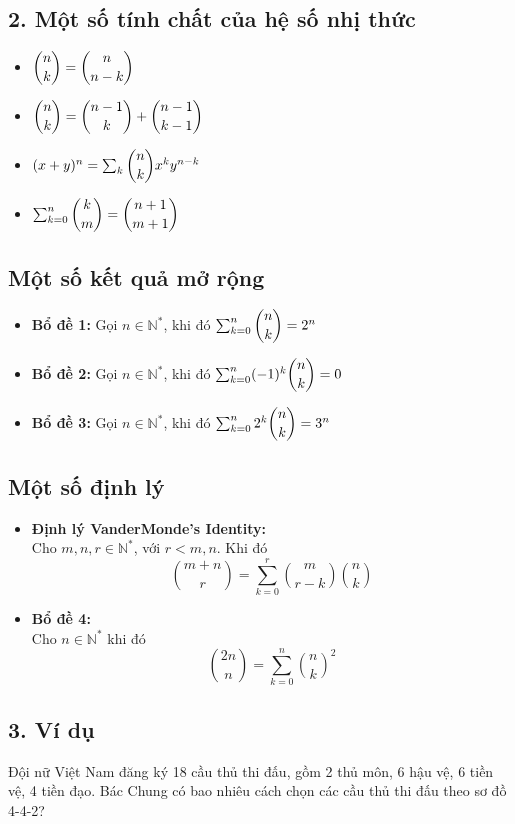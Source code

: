 \documentclass[12pt,a4paper]{article}
\begin{document}
\subsection*{2. Một số tính chất của hệ số nhị thức}
\begin{itemize}
    \item $\dbinom{n}{k} = \dbinom{n}{n-k}$
    \item $\dbinom{n}{k} = \dbinom{n-1}{k} + \dbinom{n-1}{k-1}$
    \item $(x+y)^n = \sum_{k} \dbinom{n}{k} x^k y^{n-k}$
    \item $\sum_{k=0}^{n} \dbinom{k}{m} = \dbinom{n+1}{m+1}$
\end{itemize}

\subsection*{Một số kết quả mở rộng}
\begin{itemize}
    \item \textbf{Bổ đề 1:} Gọi $n \in \mathbb{N}^*$, khi đó $\sum_{k=0}^{n} \dbinom{n}{k} = 2^n$
    \item \textbf{Bổ đề 2:} Gọi $n \in \mathbb{N}^*$, khi đó $\sum_{k=0}^{n} (-1)^k \dbinom{n}{k} = 0$
    \item \textbf{Bổ đề 3:} Gọi $n \in \mathbb{N}^*$, khi đó $\sum_{k=0}^{n} 2^k \dbinom{n}{k} = 3^n$
\end{itemize}

\subsection*{Một số định lý}
\begin{itemize}
    \item \textbf{Định lý VanderMonde's Identity:}\\
    Cho $m, n, r \in \mathbb{N}^*$, với $r < m, n$. Khi đó
    $$\binom{m+n}{r} = \sum_{k=0}^{r} \binom{m}{r-k}\binom{n}{k}$$
    \item \textbf{Bổ đề 4:}\\
    Cho $n \in \mathbb{N}^*$ khi đó
    $$\binom{2n}{n} = \sum_{k=0}^{n} \binom{n}{k}^2$$
\end{itemize}

\subsection*{3. Ví dụ}
Đội nữ Việt Nam đăng ký 18 cầu thủ thi đấu, gồm 2 thủ môn, 6 hậu vệ, 6 tiền vệ, 4 tiền đạo. Bác Chung có bao nhiêu cách chọn các cầu thủ thi đấu theo sơ đồ 4-4-2?
\end{document}
